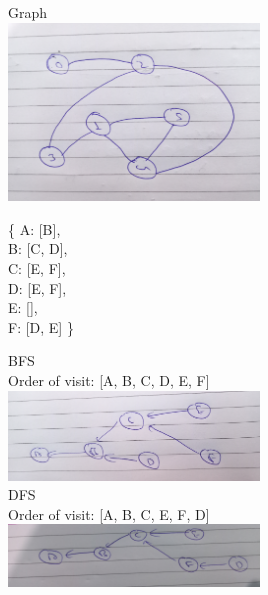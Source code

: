 \documentclass[12pt,twoside]{article}
\begin{document}


\begin{problems}

\problem  %

\begin{problemparts}
\problempart %

Graph \\
\includegraphics[width=0.5\textwidth]{1.jpg}

\problempart %
\{ A: [B], \\
   B: [C, D], \\
   C: [E, F], \\
   D: [E, F], \\
   E: [], \\
   F: [D, E] \}
   
\newpage
\problempart %
BFS \\
Order of visit: [A, B, C, D, E, F] \\
\includegraphics[width=0.5\textwidth]{2_bfs.jpg} \\

DFS \\
Order of visit: [A, B, C, E, F, D] \\
\includegraphics[width=0.5\textwidth]{2_dfs.jpg}


\end{problemparts}
\end{problems}
\end{document}
